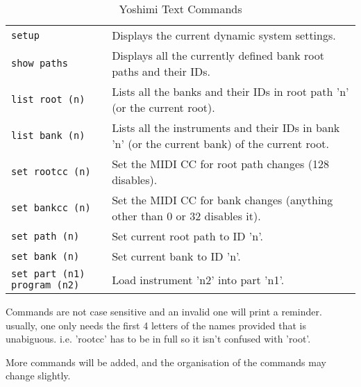   \begin{table}[H]
      \centering
      \caption{Yoshimi Text Commands}
      \label{table:yoshimi_text_commands}
      \begin{tabular}{l l}
         \texttt{setup} &
            Displays the current dynamic system settings. \\

         \texttt{show paths} &
            Displays all the currently defined bank root paths and their IDs. \\

         \texttt{list root (n)} &
            Lists all the banks and their IDs in root path 'n' (or the
            current root). \\

         \texttt{list bank (n)} &
            Lists all the instruments and their IDs in bank 'n' (or the
            current bank) of the current root. \\

         \texttt{set rootcc (n)} &
            Set the MIDI CC for root path changes (128 disables). \\

         \texttt{set bankcc (n)} &
            Set the MIDI CC for bank changes (anything other than 0 or 32
            disables it). \\

         \texttt{set path (n)} &
            Set current root path to ID 'n'. \\

         \texttt{set bank (n)} &
            Set current bank to ID 'n'. \\

         \texttt{set part (n1) program (n2)} &
            Load instrument 'n2' into part 'n1'. \\

      \end{tabular}
   \end{table}

   Commands are not case sensitive and an invalid one will print a reminder.
   usually, one only needs the first 4 letters of the names provided that is
   unabiguous. i.e. 'rootcc' has to be in full so it isn't confused with
   'root'.

   More commands will be added, and the organisation of the commands
   may change slightly.

